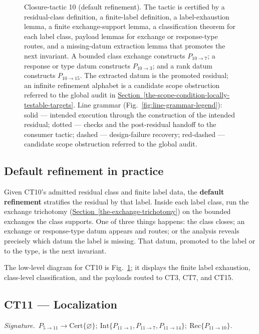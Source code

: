 \documentclass[
  11pt,
]{article}
\theoremstyle{definition}
\newcommand{\secref}[1]{\hyperref[#1]{Section~\ref*{#1}}}
\newcommand{\ctsignature}[1]{\par\noindent\emph{Signature.}\ #1\par\medskip}
\newcommand{\ctcert}[1]{\mathrm{Cert}\{#1\}}
\newcommand{\ctint}[1]{\mathrm{Int}\{#1\}}
\newcommand{\ctrec}[1]{\mathrm{Rec}\{#1\}}
\newcommand{\ctnone}{\varnothing}
\begin{document}
\begin{figure}[p]
{%
}
\caption[Closure-tactic 10: default refinement]{Closure-tactic 10 (default refinement).  The tactic is certified by a residual-class definition, a finite-label definition, a label-exhaustion lemma, a finite exchange-support lemma, a classification theorem for each label class, payload lemmas for exchange or response-type routes, and a missing-datum extraction lemma that promotes the next invariant.  A bounded class exchange constructs \(P_{10\to7}\); a response or type datum constructs \(P_{10\to3}\); and a rank datum constructs \(P_{10\to15}\).  The extracted datum is the promoted residual; an infinite refinement alphabet is a candidate scope obstruction referred to the global audit in \secref{the-scope-condition-locally-testable-targets}.  Line grammar (Fig.~\ref{fig:line-grammar-legend}): solid --- intended execution through the construction of the intended residual; dotted --- checks and the post-residual handoff to the consumer tactic; dashed --- design-failure recovery; red-dashed --- candidate scope obstruction referred to the global audit.}
\label{fig:ct10-default-refinement}
\end{figure}
\FloatBarrier

\subsection*{Default refinement in practice}

Given CT10's admitted residual class and finite label data, the
\textbf{default refinement} stratifies the residual by that label. Inside
each label class, run the exchange trichotomy (\secref{the-exchange-trichotomy}) on the bounded
exchanges the class supports. One of three things happens: the class
closes; an exchange or response-type datum appears and routes; or the analysis
reveals precisely which datum the label is missing. That datum, promoted
to the label or to the type, is the next invariant.

The low-level diagram for CT10 is Fig.~\ref{fig:ct10-default-refinement};
it displays the finite label exhaustion, class-level classification,
and the payloads routed to CT3, CT7, and CT15.



\subsection{CT11 --- Localization}\label{ct:11}\label{additivity-and-the-localization-lemma}
\ctsignature{\(P_{5\to11}\to \ctcert{\ctnone};\ \ctint{P_{11\to1},P_{11\to7},P_{11\to14}};\ \ctrec{P_{11\to10}}\).}
\end{document}
